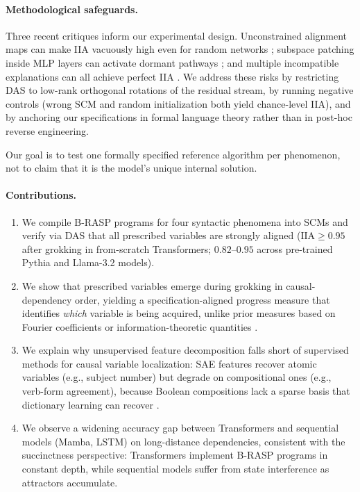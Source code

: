 \documentclass[11pt]{article}
\begin{document}
\paragraph{Methodological safeguards.}
Three recent critiques inform our experimental design.
Unconstrained alignment maps can make IIA vacuously high even for random networks \citep{sutter2025nonlinear}; subspace patching inside MLP layers can activate dormant pathways \citep{DBLP:conf/iclr/MakelovLGN24}; and multiple incompatible explanations can all achieve perfect IIA \citep{DBLP:conf/iclr/MelouxMPP25}.
We address these risks by restricting DAS to low-rank orthogonal rotations of the residual stream, by running negative controls (wrong SCM and random initialization both yield chance-level IIA), and by anchoring our specifications in formal language theory rather than in post-hoc reverse engineering.

Our goal is to test one formally specified reference algorithm per phenomenon, not to claim that it is the model's unique internal solution.

\paragraph{Contributions.}
\begin{enumerate}[itemsep=2pt,topsep=3pt,leftmargin=*]
    \item We compile B-RASP programs for four syntactic phenomena into SCMs and verify via DAS that all prescribed variables are strongly aligned ($\mathrm{IIA} \geq 0.95$ after grokking in from-scratch Transformers; $0.82$--$0.95$ across pre-trained Pythia and Llama-3.2 models).
    \item We show that prescribed variables emerge during grokking \citep[delayed generalization;][]{DBLP:journals/corr/abs-2201-02177} in causal-dependency order, yielding a specification-aligned progress measure that identifies \emph{which} variable is being acquired, unlike prior measures based on Fourier coefficients \citep{DBLP:conf/iclr/NandaCLSS23} or information-theoretic quantities \citep{DBLP:journals/corr/abs-2408-08944}.
    \item We explain why unsupervised feature decomposition falls short of supervised methods for causal variable localization: SAE features recover atomic variables (e.g., subject number) but degrade on compositional ones (e.g., verb-form agreement), because Boolean compositions lack a sparse basis that dictionary learning can recover \citep{DBLP:journals/corr/abs-2209-10652}.
    \item We observe a widening accuracy gap between Transformers and sequential models (Mamba, LSTM) on long-distance dependencies, consistent with the succinctness perspective: Transformers implement B-RASP programs in constant depth, while sequential models suffer from state interference as attractors accumulate.
\end{enumerate}
\end{document}
